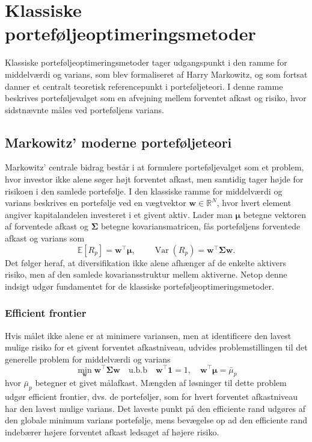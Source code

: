 \documentclass[../main.tex]{subfiles}
\begin{document}
\section{Klassiske porteføljeoptimeringsmetoder}
Klassiske porteføljeoptimeringsmetoder tager udgangspunkt i den ramme for middelværdi og varians, som blev formaliseret af Harry Markowitz, og som fortsat danner et centralt teoretisk referencepunkt i porteføljeteori. I denne ramme beskrives porteføljevalget som en afvejning mellem forventet afkast og risiko, hvor sidstnævnte måles ved porteføljens varians.

\subsection{Markowitz' moderne porteføljeteori}
Markowitz' centrale bidrag består i at formulere porteføljevalget som et problem, hvor investor ikke alene søger højt forventet afkast, men samtidig tager højde for risikoen i den samlede portefølje. I den klassiske ramme for middelværdi og varians beskrives en portefølje ved en vægtvektor $\mathbf{w}\in\mathbb{R}^{N}$, hvor hvert element angiver kapitalandelen investeret i et givent aktiv. Lader man $\boldsymbol{\mu}$ betegne vektoren af forventede afkast og $\boldsymbol{\Sigma}$ betegne kovariansmatricen, fås porteføljens forventede afkast og varians som
\begin{equation}
    \mathbb{E}[R_p] = \mathbf{w}^\top \boldsymbol{\mu},
    \qquad
    \operatorname{Var}(R_p) = \mathbf{w}^\top \boldsymbol{\Sigma} \mathbf{w}.
    \label{eq:portfolio_moments}
\end{equation}
Det følger heraf, at diversifikation ikke alene afhænger af de enkelte aktivers risiko, men af den samlede kovariansstruktur mellem aktiverne. Netop denne indsigt udgør fundamentet for de klassiske porteføljeoptimeringsmetoder.

\subsubsection{Efficient frontier}
Hvis målet ikke alene er at minimere variansen, men at identificere den lavest mulige risiko for et givent forventet afkastniveau, udvides problemstillingen til det generelle problem for middelværdi og varians
\begin{equation}
    \min_{\mathbf{w}} \mathbf{w}^\top \boldsymbol{\Sigma} \mathbf{w}
    \quad \text{u.b.b} \quad
    \mathbf{w}^\top \mathbf{1} = 1,
    \quad
    \mathbf{w}^\top \boldsymbol{\mu} = \bar{\mu}_p
    \label{eq:mean_variance_problem}
\end{equation}
hvor $\bar{\mu}_p$ betegner et givet målafkast. Mængden af løsninger til dette problem udgør efficient frontier, dvs. de porteføljer, som for hvert forventet afkastniveau har den lavest mulige varians. Det laveste punkt på den efficiente rand udgøres af den globale minimum varians portefølje, mens bevægelse op ad den efficiente rand indebærer højere forventet afkast ledsaget af højere risiko.
\end{document}
